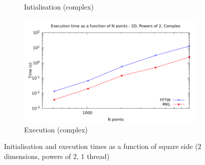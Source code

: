 \documentclass[12pt, a4paper]{article}
\begin{document}
\begin{figure}[H]
\begin{subfigure}{.5\textwidth}
\caption{Intialisation (complex)}
\label{2DPOW2CI}
\end{subfigure}%
\begin{subfigure}{.5\textwidth}
\centering
\includegraphics[width=.9\linewidth]{graphs/2d-pow2-exec-c.pdf}
\caption{Execution (complex)}
\label{2DPOW2C}
\end{subfigure}
\caption{Initialisation and execution times as a function of square side (2 dimensions, powers of 2, 1 thread)}
\label{2DPOW2}
\end{figure}
\end{document}
